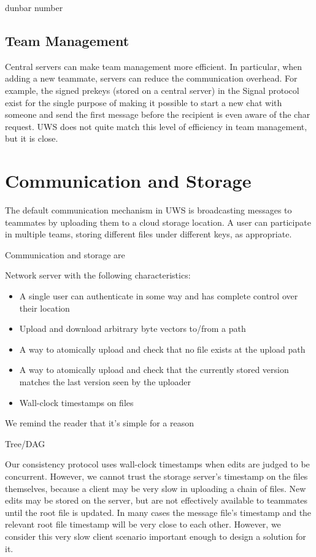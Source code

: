 \documentclass{article}
\begin{document}
dunbar number

\subsection{Team Management}

Central servers can make team management more efficient.
In particular, when adding a new teammate, servers can reduce the communication overhead.
For example, the signed prekeys (stored on a central server) in the Signal protocol exist for the single purpose of making it possible to start a new chat with someone and send the first message before the recipient is even aware of the char request.
UWS does not quite match this level of efficiency in team management, but it is close.

\section{Communication and Storage}

The default communication mechanism in UWS is broadcasting messages to teammates by uploading them to a cloud storage location.
A user can participate in multiple teams, storing different files under different keys, as appropriate.

Communication and storage are

Network server with the following characteristics:

\begin{itemize}
\item A single user can authenticate in some way and has complete control over their location
\item Upload and download arbitrary byte vectors to/from a path
\item A way to atomically upload and check that no file exists at the upload path
\item A way to atomically upload and check that the currently stored version matches the last version seen by the uploader
\item Wall-clock timestamps on files
\end{itemize}

We remind the reader that it's simple for a reason

Tree/DAG

Our consistency protocol uses wall-clock timestamps when edits are judged to be concurrent.
However, we cannot trust the storage server's timestamp on the files themselves, because a client may be very slow in uploading a chain of files.
New edits may be stored on the server, but are not effectively available to teammates until the root file is updated.
In many cases the message file's timestamp and the relevant root file timestamp will be very close to each other.
However, we consider this very slow client scenario important enough to design a solution for it.
\end{document}
